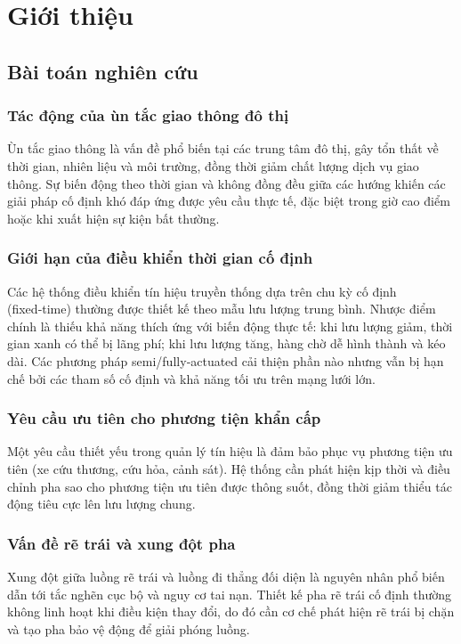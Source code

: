 \chapter{Giới thiệu}

\section{Bài toán nghiên cứu}

\subsection{Tác động của ùn tắc giao thông đô thị}
Ùn tắc giao thông là vấn đề phổ biến tại các trung tâm đô thị, gây tổn thất về thời gian, nhiên liệu và môi trường, đồng thời giảm chất lượng dịch vụ giao thông. Sự biến động theo thời gian và không đồng đều giữa các hướng khiến các giải pháp cố định khó đáp ứng được yêu cầu thực tế, đặc biệt trong giờ cao điểm hoặc khi xuất hiện sự kiện bất thường.

\subsection{Giới hạn của điều khiển thời gian cố định}
Các hệ thống điều khiển tín hiệu truyền thống dựa trên chu kỳ cố định (fixed‑time) thường được thiết kế theo mẫu lưu lượng trung bình. Nhược điểm chính là thiếu khả năng thích ứng với biến động thực tế: khi lưu lượng giảm, thời gian xanh có thể bị lãng phí; khi lưu lượng tăng, hàng chờ dễ hình thành và kéo dài. Các phương pháp semi/fully‑actuated cải thiện phần nào nhưng vẫn bị hạn chế bởi các tham số cố định và khả năng tối ưu trên mạng lưới lớn.

\subsection{Yêu cầu ưu tiên cho phương tiện khẩn cấp}
Một yêu cầu thiết yếu trong quản lý tín hiệu là đảm bảo phục vụ phương tiện ưu tiên (xe cứu thương, cứu hỏa, cảnh sát). Hệ thống cần phát hiện kịp thời và điều chỉnh pha sao cho phương tiện ưu tiên được thông suốt, đồng thời giảm thiểu tác động tiêu cực lên lưu lượng chung.

\subsection{Vấn đề rẽ trái và xung đột pha}
Xung đột giữa luồng rẽ trái và luồng đi thẳng đối diện là nguyên nhân phổ biến dẫn tới tắc nghẽn cục bộ và nguy cơ tai nạn. Thiết kế pha rẽ trái cố định thường không linh hoạt khi điều kiện thay đổi, do đó cần cơ chế phát hiện rẽ trái bị chặn và tạo pha bảo vệ động để giải phóng luồng.

